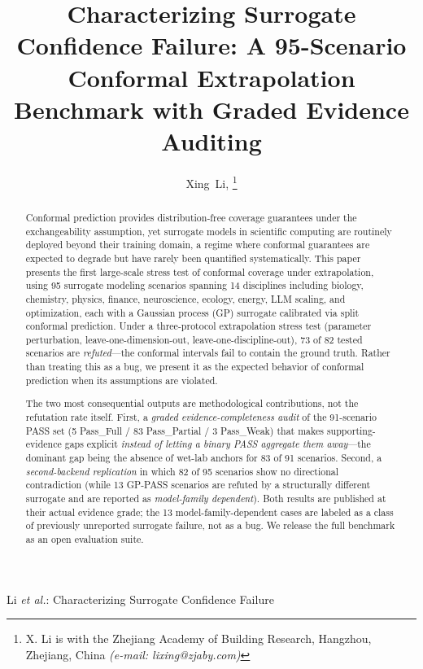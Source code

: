 \documentclass[journal]{IEEEtran}
\begin{document}
\title{Characterizing Surrogate Confidence Failure: A 95-Scenario Conformal
Extrapolation Benchmark with Graded Evidence Auditing}

\author{Xing~Li,
\thanks{X. Li is with the Zhejiang Academy of Building Research,
Hangzhou, Zhejiang, China \textit{(e-mail: lixing@zjaby.com)}}}

{Li \MakeLowercase{\textit{et al.}}: Characterizing Surrogate Confidence Failure}

\maketitle

\begin{abstract}
Conformal prediction provides distribution-free coverage guarantees under
the exchangeability assumption, yet surrogate models in scientific computing
are routinely deployed beyond their training domain, a regime where
conformal guarantees are expected to degrade but have rarely been quantified
systematically. This paper presents the first large-scale stress test of
conformal coverage under extrapolation, using 95 surrogate modeling scenarios
spanning 14 disciplines including biology, chemistry, physics, finance,
neuroscience, ecology, energy, LLM scaling, and optimization, each with a
Gaussian process (GP) surrogate calibrated via split conformal prediction.
Under a three-protocol extrapolation stress test (parameter perturbation,
leave-one-dimension-out, leave-one-discipline-out), 73 of 82 tested scenarios
are \textit{refuted}---the conformal intervals fail to contain the ground
truth. Rather than treating this as a bug, we present it as the expected
behavior of conformal prediction when its assumptions are violated.

The two most consequential outputs are methodological contributions, not the
refutation rate itself. First, a \textit{graded evidence-completeness audit}
of the 91-scenario PASS set (5 Pass\_Full / 83 Pass\_Partial / 3 Pass\_Weak)
that makes supporting-evidence gaps explicit \textit{instead of letting a
binary PASS aggregate them away}---the dominant gap being the absence of
wet-lab anchors for 83 of 91 scenarios. Second, a \textit{second-backend
replication} in which 82 of 95 scenarios show no directional contradiction
(while 13 GP-PASS scenarios are refuted by a structurally different surrogate
and are reported as \textit{model-family dependent}). Both results are
published at their actual evidence grade; the 13 model-family-dependent cases
are labeled as a class of previously unreported surrogate failure, not as a
bug. We release the full benchmark as an open evaluation suite.
\end{abstract}
\end{document}
